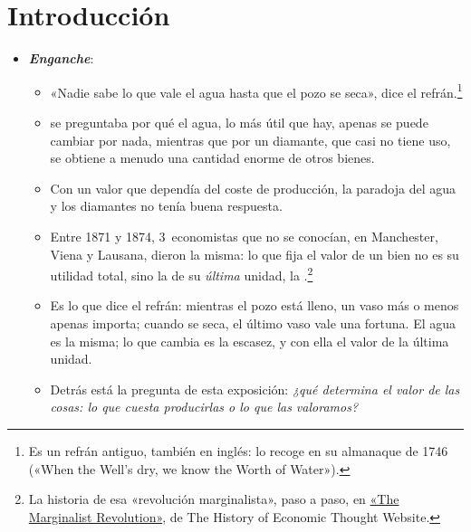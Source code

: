 \documentclass[11pt]{article}
\begin{document}
\tceetitulo

\section*{Introducción}

\begin{itemize}
\item \textbf{\emph{Enganche}}:
  \begin{itemize}
  \item «Nadie sabe lo que vale el agua hasta que el pozo se seca», dice el refrán.\footnote{Es un refrán antiguo, también en inglés:  lo recoge en su almanaque de 1746 («When the Well's dry, we know the Worth of Water»)\nocite{Franklin1746PoorRichard}.}
  \item {} se preguntaba por qué el agua, lo más útil que hay, apenas se puede cambiar por nada, mientras que por un diamante, que casi no tiene uso, se obtiene a menudo una cantidad enorme de otros bienes\nocite{Smith1776Wealth}.
  \item Con un valor que dependía del coste de producción, la paradoja del agua y los diamantes no tenía buena respuesta.
  \item Entre 1871 y 1874, 3~economistas que no se conocían, en Manchester, Viena y Lausana, dieron la misma: lo que fija el valor de un bien no es su utilidad total, sino la de su \emph{última} unidad, la .\footnote{La historia de esa «revolución marginalista», paso a paso, en \href{http://www.hetwebsite.net/het/essays/margrev/margrevcont.htm}{«The Marginalist Revolution»}, de The History of Economic Thought Website.}
  \item Es lo que dice el refrán: mientras el pozo está lleno, un vaso más o menos apenas importa; cuando se seca, el último vaso vale una fortuna. El agua es la misma; lo que cambia es la escasez, y con ella el valor de la última unidad.
  \item Detrás está la pregunta de esta exposición: \emph{¿qué determina el valor de las cosas: lo que cuesta producirlas o lo que las valoramos?}
  \end{itemize}


\end{itemize}
\end{document}
